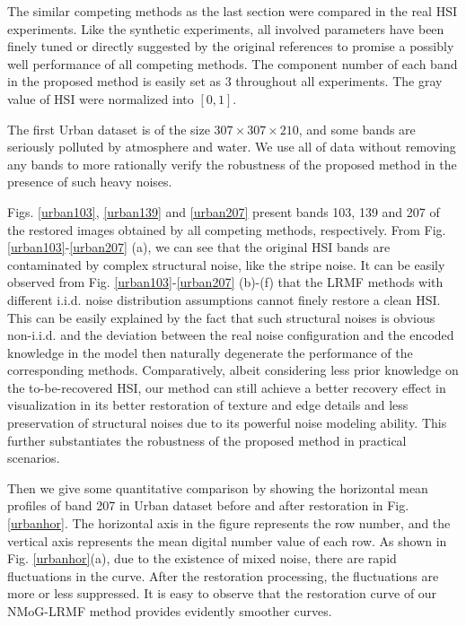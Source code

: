 \documentclass[journal]{IEEEtran}
\begin{document}
The similar competing methods as the last section were compared in the real HSI experiments. Like the synthetic experiments, all involved parameters have been finely tuned or directly suggested by the original references to promise a possibly well performance of all competing methods. The component number of each band in the proposed method is easily set as $ 3 $ throughout all experiments. The gray value of HSI were normalized into $ [0,1] $.

The first Urban dataset is of the size $ 307 \times  307 \times  210 $,  and some bands are seriously polluted by atmosphere and water. We use all of data without removing any bands to more rationally verify the robustness of the proposed method in the presence of such heavy noises.

Figs. \ref{urban103}, \ref{urban139} and \ref{urban207} present bands 103, 139 and 207 of the restored images obtained by all competing methods, respectively. From Fig. \ref{urban103}-\ref{urban207} (a), we can see that the original HSI bands are  contaminated by complex structural noise, like the stripe noise. It can be easily observed from Fig. \ref{urban103}-\ref{urban207} (b)-(f)  that the LRMF methods with different i.i.d. noise distribution assumptions cannot finely restore a clean HSI. This can be easily explained by the fact that such structural noises is obvious non-i.i.d. and the deviation between the real noise configuration and the encoded knowledge in the model then naturally degenerate the performance of the corresponding methods. Comparatively, albeit considering less prior knowledge on the to-be-recovered HSI, our method can still achieve a better recovery effect in visualization in its better restoration of texture and edge details and less preservation of structural noises due to its powerful noise modeling ability. This further substantiates the robustness of the proposed method in practical scenarios.

Then we give some quantitative comparison by showing the horizontal mean profiles of band 207 in Urban dataset before and after restoration in Fig. \ref{urbanhor}. The horizontal axis in the figure represents the row number, and the vertical axis represents the mean digital number value of each row. As shown in Fig. \ref{urbanhor}(a), due to the existence of mixed noise, there are rapid fluctuations in the curve. After the restoration processing, the fluctuations are more or less suppressed. It is easy to observe that the restoration curve of our NMoG-LRMF method provides evidently smoother curves.
\end{document}

